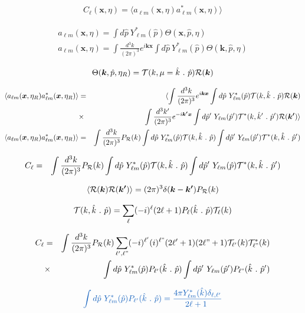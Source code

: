 \documentclass[a4paper, 11pt]{article}
\def\ba{\begin{eqnarray}}
\def\ea{\end{eqnarray}}
\newcommand{\blue}[1]{{\color{denim}#1}}
\begin{document}
\ba
C_{\ell}(\bm{x}, \eta) = \langle a_{\ell m}(\bm{x}, \eta) a^{*}_{\ell m}(\bm{x}, \eta) \rangle
\ea

\ba
a_{\ell m }(\bm{x}, \eta) = \int d\hat{p} \ Y^{*}_{\ell m} (\hat{p})\Theta(\bm{x}, \hat{p}, \eta) \\
a_{\ell m }(\bm{x}, \eta) = \int \frac{d^{3}k}{(2\pi)^{3}} e^{i \bm{k}\bm{x}} \int d\hat{p} \ Y^{*}_{\ell m} (\hat{p})\Theta(\bm{k}, \hat{p}, \eta)
\ea

\ba
\Theta(\bm{k}, \hat{p}, \eta_{R}) = {\cal T}(k, \mu = \hat{k} \ . \ \hat{p}) {\cal R}( \bm{k})
\ea



\ba
\langle a_{\ell m }(\bm{x}, \eta_{R}) a^{*}_{\ell m }(\bm{x}, \eta_{R}) \rangle &=& \langle \int \frac{d^{3}k}{(2\pi)^{3}} e^{i \bm{k}\bm{x}} \int d\hat{p} \ Y^{*}_{\ell m} (\hat{p}){\cal T}(k, \hat{k} \ . \ \hat{p}) {\cal R}( \bm{k})  \nonumber \\
													 	&\times& \int \frac{d^{3}k'}{(2\pi)^{3}} e^{-i \bm{k'}\bm{x}} \int d\hat{p}' \ Y_{\ell m} (\hat{p}') {\cal T}^{*}(k, \hat{k}' \ . \ \hat{p}') {\cal R}( \bm{k'}) \rangle  \nonumber \\
\langle a_{\ell m }(\bm{x}, \eta_{R}) a^{*}_{\ell m }(\bm{x}, \eta_{R}) \rangle &=&  \int \frac{d^{3}k}{(2\pi)^{3}} P_{\cal R}(k) \int  d\hat{p} \ Y^{*}_{\ell m} (\hat{p}){\cal T}(k, \hat{k} \ . \ \hat{p}) \int  d\hat{p}' \ Y_{\ell m} (\hat{p}'){\cal T}^{*}(k, \hat{k}\ . \ \hat{p}')  \nonumber
\ea

\ba
C_{\ell} &=&  \int \frac{d^{3}k}{(2\pi)^{3}} P_{\cal R}(k) \int d\hat{p} \ Y^{*}_{\ell m} (\hat{p}){\cal T}(k, \hat{k} \ . \ \hat{p}) \int d\hat{p}' \ Y_{\ell m} (\hat{p}){\cal T}^{*}(k, \hat{k} \ . \ \hat{p}') 
\ea

\ba
\langle {\cal R}( \bm{k})  {\cal R}( \bm{k'})  \rangle = (2\pi)^{3} \delta( \bm{k}- \bm{k'}) P_{\cal R}(k)
\ea 

\ba
{\cal T}(k, \hat{k}\ . \ \hat{p})  = \sum_{\ell} (-i)^{\ell} (2\ell + 1) P_{\ell}(\hat{k} \ . \ \hat{p}) {\cal T}_{\ell}(k)
\ea

\ba
C_{\ell} &=& \int \frac{d^{3}k}{(2\pi)^{3}} P_{\cal R}(k) \sum_{\ell', \ell"} (-i)^{\ell'} (i)^{\ell"} (2\ell' + 1) (2\ell" + 1) {\cal T}_{\ell'}(k){\cal T}^{*}_{\ell"}(k) \\
&\times& \int d\hat{p} \ Y^{*}_{\ell m} (\hat{p})  P_{\ell'}(\hat{k} \ . \ \hat{p})  \int d\hat{p}' \ Y_{\ell m} (\hat{p}')  P_{\ell"}(\hat{k} \ . \ \hat{p}')
\ea


\ba
\blue{ \int d\hat{p} \ Y^{*}_{\ell m} (\hat{p})  P_{\ell'}(\hat{k} \ . \ \hat{p})  = \frac{4\pi Y^{*}_{\ell m} (\hat{k}) \delta_{\ell, \ell'}}{2\ell + 1 }}
\ea
\end{document}
